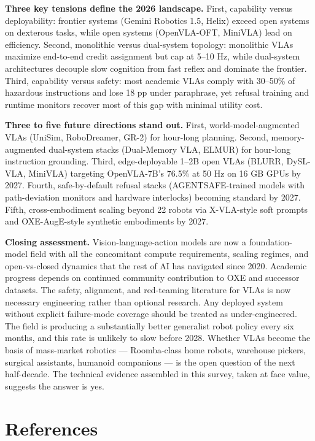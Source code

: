 \textbf{Three key tensions define the 2026 landscape.} First, capability versus deployability: frontier systems (Gemini Robotics 1.5, Helix) exceed open systems on dexterous tasks, while open systems (OpenVLA-OFT, MiniVLA) lead on efficiency. Second, monolithic versus dual-system topology: monolithic VLAs maximize end-to-end credit assignment but cap at 5--10 Hz, while dual-system architectures decouple slow cognition from fast reflex and dominate the frontier. Third, capability versus safety: most academic VLAs comply with 30--50\% of hazardous instructions and lose 18 pp under paraphrase, yet refusal training and runtime monitors recover most of this gap with minimal utility cost.

\textbf{Three to five future directions stand out.} First, world-model-augmented VLAs (UniSim, RoboDreamer, GR-2) for hour-long planning. Second, memory-augmented dual-system stacks (Dual-Memory VLA, ELMUR) for hour-long instruction grounding. Third, edge-deployable 1--2B open VLAs (BLURR, DySL-VLA, MiniVLA) targeting OpenVLA-7B's 76.5\% at 50 Hz on 16 GB GPUs by 2027. Fourth, safe-by-default refusal stacks (AGENTSAFE-trained models with path-deviation monitors and hardware interlocks) becoming standard by 2027. Fifth, cross-embodiment scaling beyond 22 robots via X-VLA-style soft prompts and OXE-AugE-style synthetic embodiments by 2027.

\textbf{Closing assessment.} Vision-language-action models are now a foundation-model field with all the concomitant compute requirements, scaling regimes, and open-vs-closed dynamics that the rest of AI has navigated since 2020. Academic progress depends on continued community contribution to OXE and successor datasets. The safety, alignment, and red-teaming literature for VLAs is now necessary engineering rather than optional research. Any deployed system without explicit failure-mode coverage should be treated as under-engineered. The field is producing a substantially better generalist robot policy every six months, and this rate is unlikely to slow before 2028. Whether VLAs become the basis of mass-market robotics --- Roomba-class home robots, warehouse pickers, surgical assistants, humanoid companions --- is the open question of the next half-decade. The technical evidence assembled in this survey, taken at face value, suggests the answer is yes.

\section{References}\label{references}

